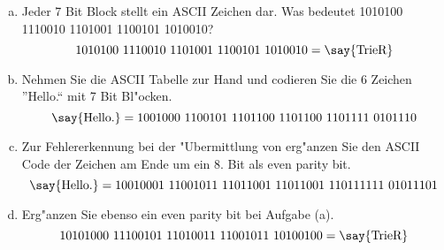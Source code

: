 \documentclass[10pt, oneside]{article}
\begin{document}
\begin{enumerate}[(a)]
    \item Jeder 7 Bit Block stellt ein ASCII Zeichen dar. Was bedeutet 1010100
        1110010 1101001 1100101 1010010?
        \begin{equation*}
            1010100\ 1110010\ 1101001\ 1100101\ 1010010 =
            \text{\say{TrieR}}
        \end{equation*}
    \item Nehmen Sie die ASCII Tabelle zur Hand und codieren Sie die 6 Zeichen
        ”Hello.“ mit 7 Bit Bl"ocken.
        \begin{equation*}
            \text{\say{Hello.}} = 1001000\ 1100101\ 1101100\ 1101100\ 1101111\ 0101110
        \end{equation*}
    \item Zur Fehlererkennung bei der "Ubermittlung von  erg"anzen Sie
        den ASCII Code der Zeichen am Ende um ein 8. Bit als even parity bit.
        \begin{equation*}
            \text{\say{Hello.}} = 10010001\ 11001011\ 11011001\ 11011001\ 110111111\ 01011101
        \end{equation*}
    \item Erg"anzen Sie ebenso ein even parity bit bei Aufgabe (a).
        \begin{equation*}
            10101000\ 11100101\ 11010011\ 11001011\ 10100100 =
            \text{\say{TrieR}}
        \end{equation*}
\end{enumerate}
\end{document}

